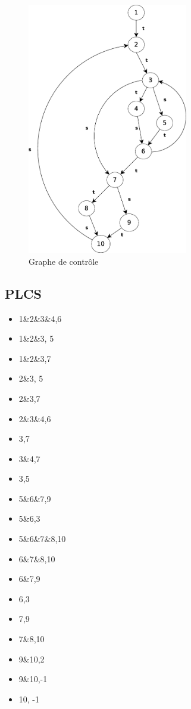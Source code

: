 \documentclass[a4paper, 11pt]{article}
\begin{document}
	\begin{figure}[H]
		\centering
		\includegraphics[width=7cm]{Diagramme.eps}
		\caption{Graphe de contrôle}
		\label{fig:graphe}
	\end{figure}
	\subsection{PLCS}
	\begin{itemize}
		\item 1\&2\&3\&4,6
		\item 1\&2\&3, 5
		\item 1\&2\&3,7
		\item 2\&3, 5
		\item 2\&3,7
		\item 2\&3\&4,6	
		\item 3,7
		\item 3\&4,7
		\item 3,5
		\item 5\&6\&7,9
		\item 5\&6,3
		\item 5\&6\&7\&8,10
		\item 6\&7\&8,10
		\item 6\&7,9
		\item 6,3
		\item 7,9
		\item 7\&8,10
		\item 9\&10,2
		\item 9\&10,-1
		\item 10, -1
	\end{itemize}
	
\end{document}
